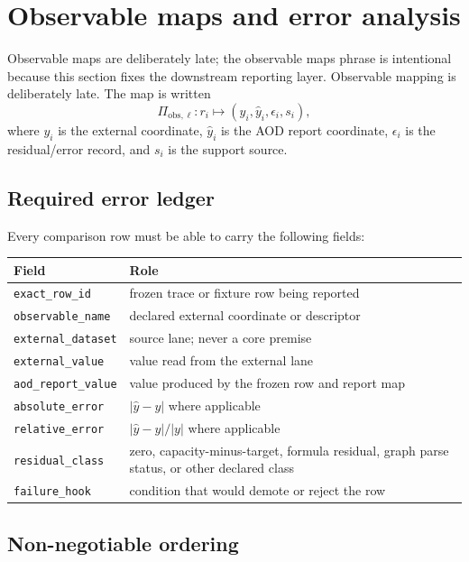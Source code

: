 \section{Observable maps and error analysis}

Observable maps are deliberately late; the observable maps phrase is intentional because this section fixes the downstream reporting layer. Observable mapping is deliberately late. The map is written
\[
\Pi_{\mathrm{obs},\ell}:r_i\mapsto (y_i,\hat y_i,\epsilon_i,s_i),
\]
where $y_i$ is the external coordinate, $\hat y_i$ is the AOD report coordinate, $\epsilon_i$ is the residual/error record, and $s_i$ is the support source.

\subsection{Required error ledger}

Every comparison row must be able to carry the following fields:
\begin{center}
\begin{tabularx}{\linewidth}{@{}lX@{}}
\toprule
Field & Role \\
\midrule
\texttt{exact\_row\_id} & frozen trace or fixture row being reported \\
\texttt{observable\_name} & declared external coordinate or descriptor \\
\texttt{external\_dataset} & source lane; never a core premise \\
\texttt{external\_value} & value read from the external lane \\
\texttt{aod\_report\_value} & value produced by the frozen row and report map \\
\texttt{absolute\_error} & $|\hat y-y|$ where applicable \\
\texttt{relative\_error} & $|\hat y-y|/|y|$ where applicable \\
\texttt{residual\_class} & zero, capacity-minus-target, formula residual, graph parse status, or other declared class \\
\texttt{failure\_hook} & condition that would demote or reject the row \\
\bottomrule
\end{tabularx}
\end{center}

\subsection{Non-negotiable ordering}

